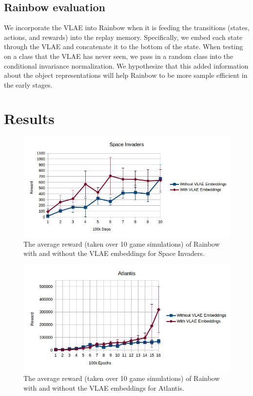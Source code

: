 \documentclass{article}
\begin{document}
\subsection{Rainbow evaluation}

We incorporate the VLAE into Rainbow when it is feeding the transitions (states, actions, and rewards) into the replay memory.
Specifically, we embed each state through the VLAE and concatenate it to the bottom of the state.
When testing on a class that the VLAE has never seen, we pass in a random class into the conditional invariance normalization.
We hypothesize that this added information about the object representations will help Rainbow to be more sample efficient in the early stages.

\section{Results}

\begin{figure}
  \includegraphics[width=0.8\linewidth]{space_invaders.jpg}
  \caption{The average reward (taken over 10 game simulations) of Rainbow with and without the VLAE embeddings for Space Invaders.}
  \label{fig:spaceinvaders}
\end{figure}

\begin{figure}
  \includegraphics[width=0.8\linewidth]{atlantis.jpg}
  \caption{The average reward (taken over 10 game simulations) of Rainbow with and without the VLAE embeddings for Atlantis.}
  \label{fig:atlantis}
\end{figure}
\end{document}
